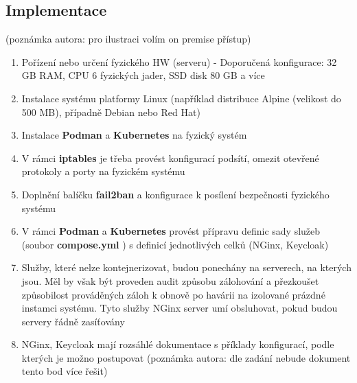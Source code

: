 \documentclass[a4paper,12pt]{article}
\begin{document}
\subsection{Implementace}

(poznámka autora: pro ilustraci volím on premise přístup)\par

\begin{enumerate}

\item Pořízení nebo určení fyzického HW (serveru) - Doporučená konfigurace: 32 GB RAM, CPU 6 fyzických jader, SSD disk 80 GB a více

\item Instalace systému platformy Linux (například distribuce Alpine (velikost do 500 MB), případně Debian nebo Red Hat)

\item Instalace \textbf{Podman}
 a \textbf{Kubernetes}
 na fyzický systém

\item V rámci \textbf{iptables}
 je třeba provést konfigurací podsítí, omezit otevřené protokoly a porty na fyzickém systému

\item Doplnění balíčku \textbf{fail2ban}
 a konfigurace k posílení bezpečnosti fyzického systému

\item V rámci \textbf{Podman}
 a \textbf{Kubernetes}
 provést přípravu definic sady služeb (soubor \textbf{compose.yml}
) s definicí jednotlivých celků (NGinx, Keycloak)

\item Služby, které nelze kontejnerizovat, budou ponechány na serverech, na kterých jsou. Měl by však být proveden audit způsobu zálohování a přezkoušet způsobilost prováděných záloh k obnově po havárii na izolované prázdné instamci systému. Tyto služby NGinx server umí obsluhovat, pokud budou servery řádně zasíťovány

\item NGinx, Keycloak mají rozsáhlé dokumentace s příklady konfigurací, podle kterých je možno postupovat (poznámka autora: dle zadání nebude dokument tento bod více řešit)

\end{enumerate}


\pagestyle{fancy}
\listoffigures
\printindex
\end{document}
